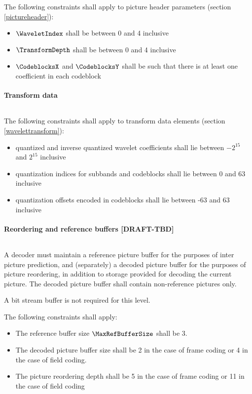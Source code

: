 The following constraints shall apply to picture header parameters
(section \ref{pictureheader}):
\begin{itemize}
\item $\WaveletIndex$ shall be between 0 and 4 inclusive
\item $\TransformDepth$ shall be between 0 and 4 inclusive
\item $\CodeblocksX$ and $\CodeblocksY$ shall be such that there is 
    at least one coefficient in each codeblock
\end{itemize}

\paragraph{Transform data}$\ $\newline

The following constraints shall apply to transform data elements 
(section \ref{wavelettransform}):
\begin{itemize}
\item quantized and inverse quantized wavelet coefficients shall lie 
between $-2^{15}$ and $2^{15}$ inclusive
\item quantization indices for subbands and codeblocks shall lie between 
    0 and 63 inclusive 
\item quantization offsets encoded in codeblocks shall lie between 
    -63 and 63 inclusive
\end{itemize} 

\paragraph{Reordering and reference buffers [DRAFT-TBD]}$\ $\newline


A decoder must maintain a reference picture buffer for the 
purposes of inter picture prediction, and (separately) a decoded 
picture buffer for the purposes of picture reordering, in addition to 
storage provided for decoding the current picture. The decoded picture
buffer shall contain non-reference pictures only. 

A bit stream buffer is not required for this level.

The following constraints shall apply:
\begin{itemize}
\item The reference buffer size $\MaxRefBufferSize$ shall be 3.
\item The decoded picture buffer size shall be 2 in the case
of frame coding or 4 in the case of field coding.
\item The picture reordering depth shall be 5 in the case of frame coding
or 11 in the case of field coding
\end{itemize}














